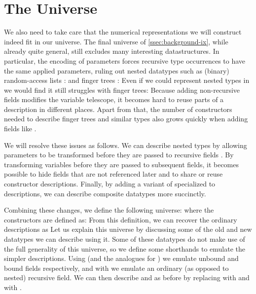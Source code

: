 \section{The Universe}\label{ssec:desc}
We also need to take care that the numerical representations we will construct indeed fit in our universe. The final universe  of \autoref{ssec:background-ix}, while already quite general, still excludes many interesting datastructures. In particular, the encoding of parameters forces recursive type occurrences to have the same applied parameters, ruling out nested datatypes such as (binary) random-access lists \cite{calcdata,purelyfunctional}:
and finger trees \cite{fingertrees}:
Even if we could represent nested types in  we would find it still struggles with finger trees: Because adding non-recursive fields modifies the variable telescope, it becomes hard to reuse parts of a description in different places. Apart from that, the number of constructors needed to describe finger trees and similar types also grows quickly when adding fields like .

We will resolve these issues as follows. We can describe nested types by allowing parameters to be transformed before they are passed to recursive fields \cite{initenough}. By transforming variables before they are passed to subsequent fields, it becomes possible to hide fields that are not referenced later and to share or reuse constructor descriptions. Finally, by adding a variant of  specialized to descriptions, we can describe composite datatypes more succinctly.

Combining these changes, we define the following universe:
where the constructors are defined as:
From this definition, we can recover the ordinary descriptions as
Let us explain this universe by discussing some of the old and new datatypes we can describe using it. Some of these datatypes do not make use of the full generality of this universe, so we define some shorthands to emulate the simpler descriptions. Using 
(and the analogues for ) we emulate unbound and bound fields respectively, and with 
we emulate an ordinary (as opposed to nested) recursive field. We can then describe \bN{} and  as before
by replacing  with  and  with .

